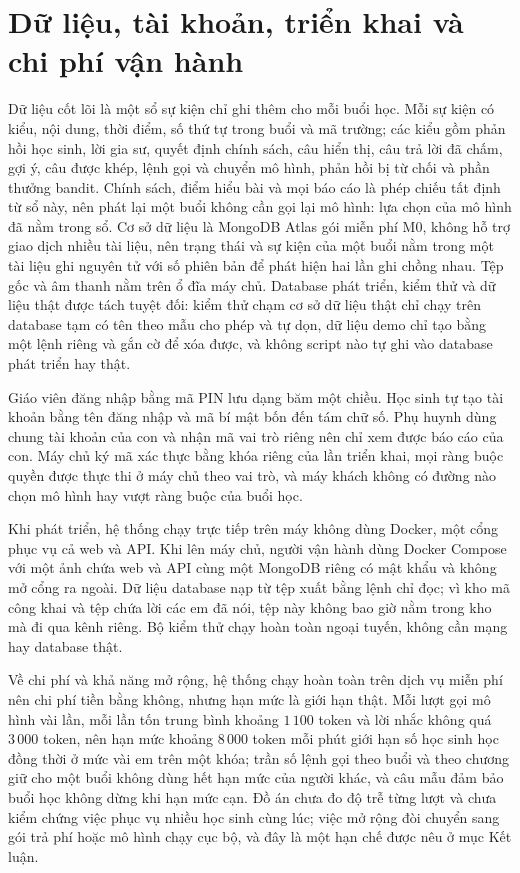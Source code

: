 \section{Dữ liệu, tài khoản, triển khai và chi phí vận hành}\label{sec:data-design}
Dữ liệu cốt lõi là một sổ sự kiện chỉ ghi thêm cho mỗi buổi học. Mỗi sự kiện có kiểu, nội dung, thời điểm, số thứ tự trong buổi và mã trường; các kiểu gồm phản hồi học sinh, lời gia sư, quyết định chính sách, câu hiển thị, câu trả lời đã chấm, gợi ý, câu được khép, lệnh gọi và chuyển mô hình, phản hồi bị từ chối và phần thưởng bandit. Chính sách, điểm hiểu bài và mọi báo cáo là phép chiếu tất định từ sổ này, nên phát lại một buổi không cần gọi lại mô hình: lựa chọn của mô hình đã nằm trong sổ. Cơ sở dữ liệu là MongoDB Atlas gói miễn phí M0, không hỗ trợ giao dịch nhiều tài liệu, nên trạng thái và sự kiện của một buổi nằm trong một tài liệu ghi nguyên tử với số phiên bản để phát hiện hai lần ghi chồng nhau. Tệp gốc và âm thanh nằm trên ổ đĩa máy chủ. Database phát triển, kiểm thử và dữ liệu thật được tách tuyệt đối: kiểm thử chạm cơ sở dữ liệu thật chỉ chạy trên database tạm có tên theo mẫu cho phép và tự dọn, dữ liệu demo chỉ tạo bằng một lệnh riêng và gắn cờ để xóa được, và không script nào tự ghi vào database phát triển hay thật.

Giáo viên đăng nhập bằng mã PIN lưu dạng băm một chiều. Học sinh tự tạo tài khoản bằng tên đăng nhập và mã bí mật bốn đến tám chữ số. Phụ huynh dùng chung tài khoản của con và nhận mã vai trò riêng nên chỉ xem được báo cáo của con. Máy chủ ký mã xác thực bằng khóa riêng của lần triển khai, mọi ràng buộc quyền được thực thi ở máy chủ theo vai trò, và máy khách không có đường nào chọn mô hình hay vượt ràng buộc của buổi học.

Khi phát triển, hệ thống chạy trực tiếp trên máy không dùng Docker, một cổng phục vụ cả web và API. Khi lên máy chủ, người vận hành dùng Docker Compose với một ảnh chứa web và API cùng một MongoDB riêng có mật khẩu và không mở cổng ra ngoài. Dữ liệu database nạp từ tệp xuất bằng lệnh chỉ đọc; vì kho mã công khai và tệp chứa lời các em đã nói, tệp này không bao giờ nằm trong kho mà đi qua kênh riêng. Bộ kiểm thử chạy hoàn toàn ngoại tuyến, không cần mạng hay database thật.

Về chi phí và khả năng mở rộng, hệ thống chạy hoàn toàn trên dịch vụ miễn phí nên chi phí tiền bằng không, nhưng hạn mức là giới hạn thật. Mỗi lượt gọi mô hình vài lần, mỗi lần tốn trung bình khoảng $1\,100$ token và lời nhắc không quá $3\,000$ token, nên hạn mức khoảng $8\,000$ token mỗi phút giới hạn số học sinh học đồng thời ở mức vài em trên một khóa; trần số lệnh gọi theo buổi và theo chương giữ cho một buổi không dùng hết hạn mức của người khác, và câu mẫu đảm bảo buổi học không dừng khi hạn mức cạn. Đồ án chưa đo độ trễ từng lượt và chưa kiểm chứng việc phục vụ nhiều học sinh cùng lúc; việc mở rộng đòi chuyển sang gói trả phí hoặc mô hình chạy cục bộ, và đây là một hạn chế được nêu ở mục Kết luận.

